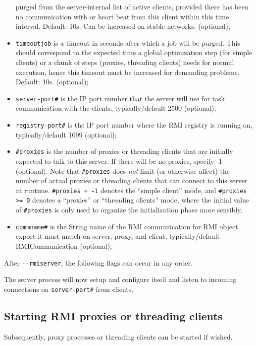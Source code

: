\documentclass[a4paper,10pt]{scrbook}
\begin{document}
\begin{itemize}
    purged from the server-internal list of active clients, provided there has
    been no communication with or heart beat from this client within this time
    interval. Default: 10s. Can be increased on stable networks. (optional);
  \item \texttt{timeoutjob} is a timeout in seconds after which a job will be 
    purged. This should correspond to the expected time a global optimization
    step (for simple clients) or a chunk of steps (proxies, threading clients)
    needs for normal execution, hence this timeout must be increased for
    demanding problems. Default: 10s. (optional);
  \item \texttt{server-port\#} is the IP port number that the server will use
    for task communication with the clients, typically/default 2500 (optional);
  \item \texttt{registry-port\#} is the IP port number where the RMI registry is
    running on, typically/default 1099 (optional);
  \item \texttt{\#proxies} is the number of proxies or threading clients that
    are initially expected to talk to this server. If there will be no
    proxies, specify -1 (optional).
    Note that \texttt{\#proxies} does \textit{not} limit (or otherwise affect)
    the number of actual proxies or threading clients that can connect to this
    server at runtime. \texttt{\#proxies = -1} denotes the ``simple client''
    mode, and \texttt{\#proxies >= 0} denotes a ``proxies'' or ``threading
    clients'' mode, where the initial value of \texttt{\#proxies} is only used
    to organize the initialization phase more sensibly.
  \item \texttt{commname\#} is the String name of the RMI communication for RMI 
    object export it must match on server, proxy, and client, typically/default
    RMICommunication (optional);
\end{itemize}
After \verb|--rmiserver|, the following flags can occur in any order.

The server process will now setup and configure itself and listen to incoming 
connections on \verb|server-port#| from clients.

\subsection{Starting RMI proxies or threading clients}

Subsequently, proxy processes or threading clients can be started if wished.
\end{document}
